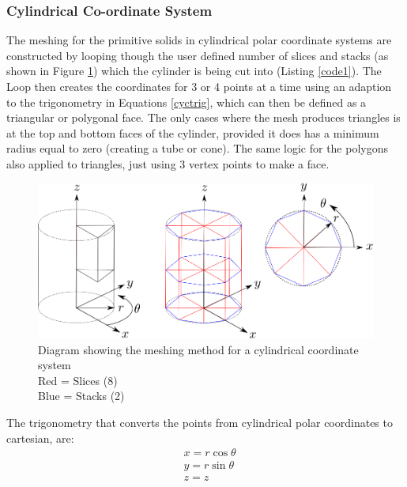 \documentclass[12pt,a4paper]{article}
\begin{document}
\subsubsection{Cylindrical Co-ordinate System}
\label{cycl}
The meshing for the primitive solids in cylindrical polar coordinate systems are constructed by looping though the user defined number of slices and stacks (as shown in Figure \ref{cylmeshin}) which the cylinder is being cut into (Listing \ref{code1}). The Loop then creates the coordinates for 3 or 4 points at a time using an adaption to the trigonometry in Equations \ref{cyctrig}, which can then be defined as a triangular or polygonal face. The only cases where the mesh produces triangles is at the top and bottom faces of the cylinder, provided it does has a minimum radius equal to zero (creating a tube or cone). The same logic for the polygons also applied to triangles, just using 3 vertex points to make a face.

\begin{figure}[h!]
\centering
\includegraphics[scale=0.45]{Images//Coords//cyl.png}
\caption[width=\columnwidth]{Diagram showing the meshing method for a cylindrical coordinate system\\
Red = Slices   (8)\\
Blue = Stacks (2)}
\label{cylmeshin}
\end{figure}
\vspace{0.3cm}
The trigonometry that converts the points from cylindrical polar coordinates to cartesian, are:
\begin{equation}
\begin{aligned}
\label{cyctrig}
& x = r \cos{\theta} \\
& y = r \sin{\theta} \\
& z = z
\end{aligned}
\end{equation}
\end{document}
